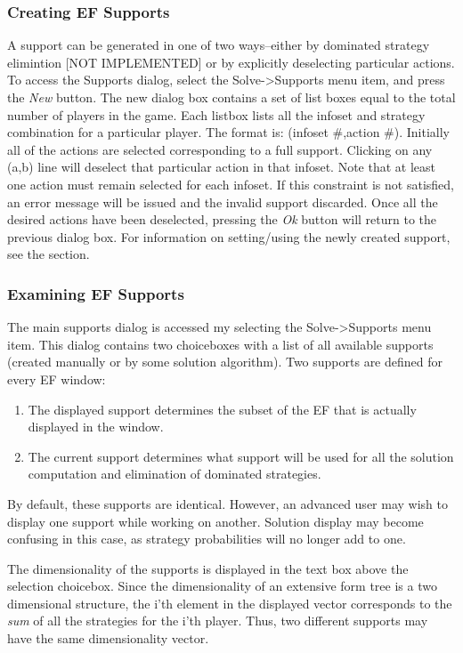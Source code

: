 \subsubsection{Creating EF Supports}
A support can be generated in one of two ways--either by dominated strategy elimintion
[NOT IMPLEMENTED] or by explicitly deselecting particular actions.  To access the 
Supports dialog, select the Solve->Supports menu item, and press the {\em New} button.
The new dialog box contains a set of list boxes equal to the total number of players in the
game.  Each listbox lists all the infoset and strategy combination for a particular player.
The format is: (infoset #,action #).  Initially all of the actions are selected corresponding
to a full support.  Clicking on any (a,b) line will deselect that particular action in that
infoset.  Note that at least one action must remain selected for each infoset.  If this 
constraint is not satisfied, an error message will be issued and the invalid support discarded.
Once all the desired actions have been deselected, pressing the {\em Ok} button will return
to the previous dialog box.  For information on setting/using the newly created support, see
the  section.

\subsubsection{Examining EF Supports}\label{efsuptexam}
The main supports dialog is accessed my selecting the Solve->Supports menu item.  This dialog
contains two choiceboxes with a list of all available supports (created manually or 
by some solution algorithm).
Two supports are defined for every EF window:
\begin{enumerate}
\item The displayed support determines the subset of the EF that is actually
displayed in the window.
\item The current support determines what support will be used for all the solution
computation and elimination of dominated strategies. 
\end{enumerate}
By default, these supports are identical.  However, an advanced user may wish to
display one support while working on another.  Solution display may become 
confusing in this case, as strategy probabilities will no longer add to one.  

The dimensionality of the supports is displayed in the text box above the selection
choicebox.  Since the dimensionality of an extensive form tree is a two dimensional structure,
the i'th element in the displayed vector corresponds to the {\em sum} of all the strategies
for the i'th player.  Thus, two different supports may have the same dimensionality vector.


